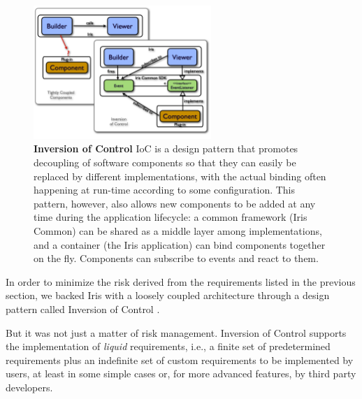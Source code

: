 \documentclass[final,5p,authoryear]{elsarticle}
\begin{document}
\begin{figure} \begin{center}
\includegraphics[width=0.6\textwidth]{figures/IrisDiagrams.003.png}
\caption{\textbf{Inversion of Control} IoC is a design pattern that promotes
decoupling of software components so that they can easily be replaced by
different implementations, with the actual binding often happening at run-time
according to some configuration. This pattern, however, also allows new
components to be added at any time during the application lifecycle: a common
framework (Iris Common) can be shared as a middle layer among implementations,
and a container (the Iris application) can bind components together on the fly.
Components can subscribe to events and react to them.} \label{fig:ioc}
\end{center} \end{figure}


In order to minimize the risk derived from the requirements listed in the previous 
section, we backed Iris with a loosely coupled architecture through a design 
pattern called Inversion of Control \citep*{ioc}. 

But it was not just a matter of risk management. Inversion of Control  
supports the implementation of \emph{liquid} requirements, i.e., a finite set of
predetermined requirements plus an indefinite set of custom requirements to be
implemented by users, at least in some simple cases or, for more advanced
features, by third party developers.
\end{document}
